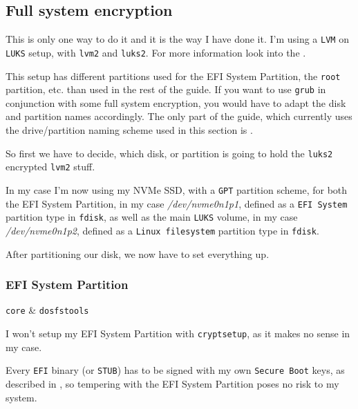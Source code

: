 \documentclass[10pt]{dustdoc}
\begin{document}
\subsection{Full system encryption}
\label{sec:full-system-encryption}

\begin{NOTE}
    This is only one way to do it and it is the way I have done it.
    I’m using a \texttt{LVM} on \texttt{LUKS} setup, with \texttt{lvm2} and \texttt{luks2}.
    For more information look into the .
\end{NOTE}

\begin{NOTE}
    This setup has different partitions used for the EFI System Partition, the \texttt{root} partition, etc. than used in the rest of the guide.
    If you want to use \texttt{grub} in conjunction with some full system encryption, you would have to adapt the disk and partition names accordingly.
    The only part of the guide, which currently uses the drive/partition naming scheme used in this section is .
\end{NOTE}

So first we have to decide, which disk, or partition is going to hold the \texttt{luks2} encrypted \texttt{lvm2} stuff.

In my case I’m now using my NVMe SSD, with a \texttt{GPT} partition scheme, for both the EFI System Partition, in my case \textit{/dev/nvme0n1p1}, defined as a \texttt{EFI System} partition type in \texttt{fdisk}, as well as the main \texttt{LUKS} volume, in my case \textit{/dev/nvme0n1p2}, defined as a \texttt{Linux filesystem} partition type in \texttt{fdisk}.

After partitioning our disk, we now have to set everything up.

\subsubsection{EFI System Partition}
\label{sec:efi-system-partition}

\begin{packagetable}
    \texttt{core} & \texttt{dosfstools} \\ 
\end{packagetable}

I won’t setup my EFI System Partition with \texttt{cryptsetup}, as it makes no sense in my case.

Every \texttt{EFI} binary (or \texttt{STUB}) has to be signed with my own \texttt{Secure Boot} keys, as described in , so tempering with the EFI System Partition poses no risk to my system.
\end{document}
